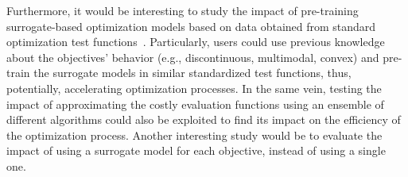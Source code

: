 Furthermore, it would be interesting to study the impact of pre-training surrogate-based optimization models based on data obtained from standard optimization test functions~\cite{Zhang2009TEST}. Particularly, users could use previous knowledge about the objectives' behavior (e.g., discontinuous, multimodal, convex) and pre-train the surrogate models in similar standardized test functions, thus, potentially, accelerating optimization processes. In the same vein, testing the impact of approximating the costly evaluation functions using an ensemble of different algorithms could also be exploited to find its impact on the efficiency of the optimization process. %
Another interesting study would be to evaluate the impact of using a surrogate model for each objective, instead of using a single one. 
